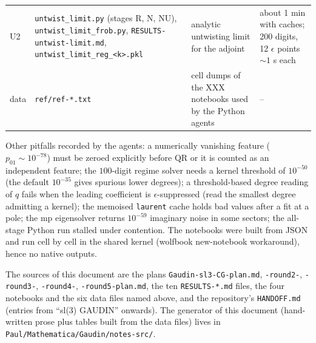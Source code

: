 \documentclass[11pt]{article}
\begin{document}
{\begin{longtable}{p{1.0cm}p{4.2cm}p{4.6cm}p{3.6cm}}
U2 & \texttt{untwist\_\allowbreak{}limit.\allowbreak{}py} (stages R, N, NU), \texttt{untwist\_\allowbreak{}limit\_\allowbreak{}frob.\allowbreak{}py}, \texttt{RESULTS-\allowbreak{}untwist-\allowbreak{}limit.\allowbreak{}md}, \texttt{untwist\_\allowbreak{}limit\_\allowbreak{}reg\_\allowbreak{}<k>.\allowbreak{}pkl} & analytic untwisting limit for the adjoint & about 1 min with caches; 200 digits, 12 $\epsilon$ points $\sim1$ s each \\
data & \texttt{ref/\allowbreak{}ref-\allowbreak{}*.\allowbreak{}txt} & cell dumps of the XXX notebooks used by the Python agents & -- \\
\end{longtable}}


Other pitfalls recorded by the agents: a numerically vanishing feature ($p_{01}\sim10^{-78}$) must be zeroed explicitly before QR or it is counted as an independent feature; the $100$-digit regime solver needs a kernel threshold of $10^{-50}$ (the default $10^{-35}$ gives spurious lower degrees); a threshold-based degree reading of $q$ fails when the leading coefficient is $\epsilon$-suppressed (read the smallest degree admitting a kernel); the memoised \texttt{laurent} cache holds bad values after a fit at a pole; the mp eigensolver returns $10^{-59}$ imaginary noise in some sectors; the all-stage Python run stalled under contention.
The notebooks were built from JSON and run cell by cell in the shared kernel (wolfbook new-notebook workaround), hence no native outputs.

The sources of this document are the plans \texttt{Gaudin-\allowbreak{}sl3-\allowbreak{}CG-\allowbreak{}plan.\allowbreak{}md}, \texttt{-\allowbreak{}round2-\allowbreak{}}, \texttt{-\allowbreak{}round3-\allowbreak{}}, \texttt{-\allowbreak{}round4-\allowbreak{}}, \texttt{-\allowbreak{}round5-\allowbreak{}plan.\allowbreak{}md}, the ten \texttt{RESULTS-\allowbreak{}*.\allowbreak{}md} files, the four notebooks and the six data files named above, and the repository's \texttt{HANDOFF.\allowbreak{}md} (entries from ``sl(3) GAUDIN'' onwards).
The generator of this document (hand-written prose plus tables built from the data files) lives in \texttt{Paul/\allowbreak{}Mathematica/\allowbreak{}Gaudin/\allowbreak{}notes-\allowbreak{}src/\allowbreak{}}.
\end{document}

